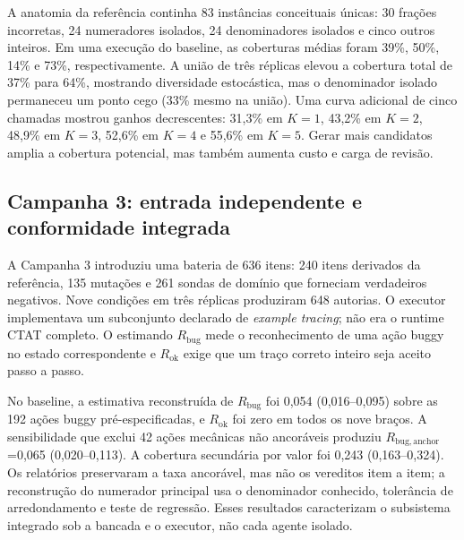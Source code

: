 \documentclass[11pt,a4paper]{article}
\newcommand{\Rbug}{\ensuremath{R_{\mathrm{bug}}}}
\newcommand{\Rok}{\ensuremath{R_{\mathrm{ok}}}}
\newcommand{\Rbuganchor}{\ensuremath{R_{\mathrm{bug,anchor}}}}
\begin{document}
A anatomia da referência continha 83 instâncias conceituais únicas: 30 frações incorretas, 24 numeradores isolados, 24 denominadores isolados e cinco outros inteiros. Em uma execução do baseline, as coberturas médias foram 39\%, 50\%, 14\% e 73\%, respectivamente. A união de três réplicas elevou a cobertura total de 37\% para 64\%, mostrando diversidade estocástica, mas o denominador isolado permaneceu um ponto cego (33\% mesmo na união). Uma curva adicional de cinco chamadas mostrou ganhos decrescentes: 31,3\% em $K=1$, 43,2\% em $K=2$, 48,9\% em $K=3$, 52,6\% em $K=4$ e 55,6\% em $K=5$. Gerar mais candidatos amplia a cobertura potencial, mas também aumenta custo e carga de revisão.

\subsection{Campanha 3: entrada independente e conformidade integrada}

A Campanha 3 introduziu uma bateria de 636 itens: 240 itens derivados da referência, 135 mutações e 261 sondas de domínio que forneciam verdadeiros negativos. Nove condições em três réplicas produziram 648 autorias. O executor implementava um subconjunto declarado de \emph{example tracing}; não era o runtime CTAT completo. O estimando \Rbug{} mede o reconhecimento de uma ação buggy no estado correspondente e \Rok{} exige que um traço correto inteiro seja aceito passo a passo.

No baseline, a estimativa reconstruída de \Rbug{} foi 0,054 (0,016--0,095) sobre as 192 ações buggy pré-especificadas, e \Rok{} foi zero em todos os nove braços. A sensibilidade que exclui 42 ações mecânicas não ancoráveis produziu \Rbuganchor{}=0,065 (0,020--0,113). A cobertura secundária por valor foi 0,243 (0,163--0,324). Os relatórios preservaram a taxa ancorável, mas não os vereditos item a item; a reconstrução do numerador principal usa o denominador conhecido, tolerância de arredondamento e teste de regressão. Esses resultados caracterizam o subsistema integrado sob a bancada e o executor, não cada agente isolado.
\end{document}
